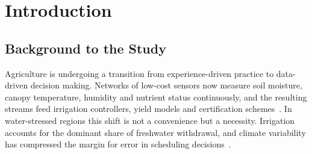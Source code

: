 \documentclass[12pt,a4paper,oneside]{book}
\begin{document}
\clearpage

\clearpage
 
\begin{singlespace}
\renewcommand{\contentsname}{}
\vspace{-3\baselineskip}
\tableofcontents
\end{singlespace}
\clearpage

\begin{singlespace}
\renewcommand{\listfigurename}{}
\vspace{-3\baselineskip}
\listoffigures
\end{singlespace}
\clearpage

\begin{singlespace}
\renewcommand{\listtablename}{}
\vspace{-3\baselineskip}
\listoftables
\end{singlespace}
\clearpage

\begin{singlespace}
\printunsrtglossary[type=abbreviations,title={},style=long]
\end{singlespace}
\clearpage

\mainmatter

\clearpage{}

\chapter{Introduction}
\label{ch:introduction}

\section{Background to the Study}
\label{sec:background}

Agriculture is undergoing a transition from experience-driven practice to
data-driven decision making. Networks of low-cost sensors now measure soil
moisture, canopy temperature, humidity and nutrient status continuously, and
the resulting streams feed irrigation controllers, yield models and
certification schemes~\cite{rathi2025smart, brooks2019precisionWater}. In
water-stressed regions this shift is not a convenience but a necessity.
Irrigation accounts for the dominant share of freshwater withdrawal, and
climate variability has compressed the margin for error in scheduling
decisions~\cite{miller2020climateImpact, williams2022savings}.
\end{document}
